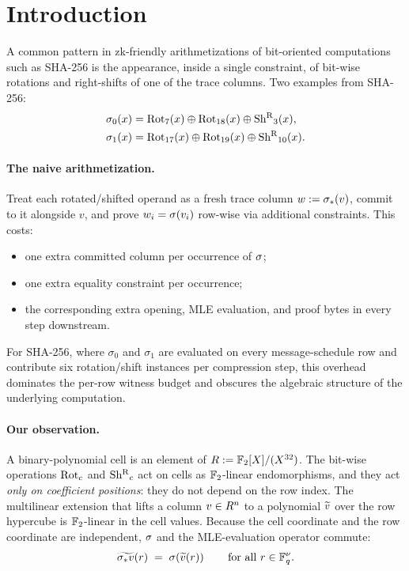 \section{Introduction}
\label{sec:intro}

A common pattern in zk-friendly arithmetizations of bit-oriented
computations such as SHA-256 is the appearance, inside a single
constraint, of bit-wise rotations and right-shifts of one of the trace
columns. Two examples from SHA-256:
\begin{align*}
\sigma_0(x) &= \operatorname{Rot}_7(x) \oplus \operatorname{Rot}_{18}(x) \oplus \operatorname{Sh^{R}}_3(x), \\
\sigma_1(x) &= \operatorname{Rot}_{17}(x) \oplus \operatorname{Rot}_{19}(x) \oplus \operatorname{Sh^{R}}_{10}(x).
\end{align*}

\paragraph{The naive arithmetization.} Treat each rotated/shifted
operand as a fresh trace column $w := \sigma_*(v)$, commit to it
alongside $v$, and prove $w_i = \sigma(v_i)$ row-wise via additional
constraints. This costs:
\begin{itemize}[leftmargin=2em]
  \item one extra committed column per occurrence of $\sigma$;
  \item one extra equality constraint per occurrence;
  \item the corresponding extra opening, MLE evaluation, and proof bytes
    in every step downstream.
\end{itemize}
For SHA-256, where $\sigma_0$ and $\sigma_1$ are evaluated on every
message-schedule row and contribute six rotation/shift instances per
compression step, this overhead dominates the per-row witness budget
and obscures the algebraic structure of the underlying computation.

\paragraph{Our observation.} A binary-polynomial cell is an element of
$R := \mathbb{F}_2[X]/(X^{32})$. The bit-wise operations
$\operatorname{Rot}_c$ and $\operatorname{Sh^{R}}_c$ act on cells as $\mathbb{F}_2$-linear endomorphisms, and
they act \emph{only on coefficient positions}: they do not depend on
the row index. The multilinear extension that lifts a column $v \in
R^n$ to a polynomial $\widetilde{v}$ over the row hypercube is
$\mathbb{F}_2$-linear in the cell values. Because the cell coordinate and the
row coordinate are independent, $\sigma$ and the MLE-evaluation
operator commute:
\[
  \widetilde{\sigma_* v}(r) \;=\; \sigma\!\left(\widetilde{v}(r)\right)
  \qquad \text{for all } r \in \mathbb{F}_q^{\nu}.
\]

